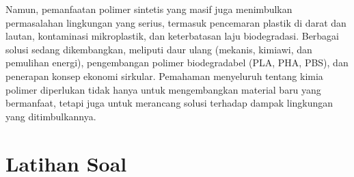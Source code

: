 \documentclass[12pt,a4paper,openany]{book}
\begin{document}
Namun, pemanfaatan polimer sintetis yang masif juga menimbulkan permasalahan lingkungan yang serius, termasuk pencemaran plastik di darat dan lautan, kontaminasi mikroplastik, dan keterbatasan laju biodegradasi. Berbagai solusi sedang dikembangkan, meliputi daur ulang (mekanis, kimiawi, dan pemulihan energi), pengembangan polimer biodegradabel (PLA, PHA, PBS), dan penerapan konsep ekonomi sirkular. Pemahaman menyeluruh tentang kimia polimer diperlukan tidak hanya untuk mengembangkan material baru yang bermanfaat, tetapi juga untuk merancang solusi terhadap dampak lingkungan yang ditimbulkannya.


\section{Latihan Soal}
\end{document}
